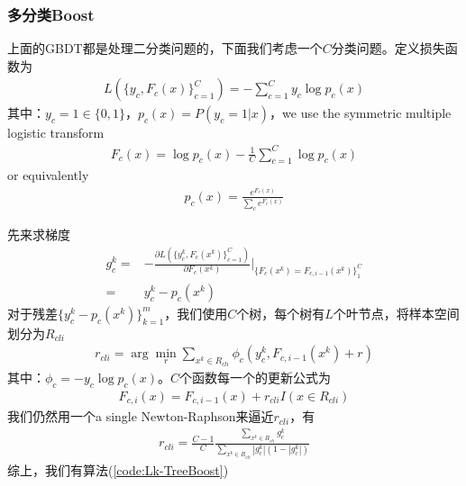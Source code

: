           \subsubsection{多分类Boost}
              \par
              上面的GBDT都是处理二分类问题的，下面我们考虑一个$C$分类问题。定义损失函数为
              \begin{align*}
              L(\{y_c,F_c(x)\}_{c=1}^C) = -\sum_{c=1}^C y_c \log p_c(x)
              \end{align*}
              其中：$y_c = 1\in \{0,1\}$，$p_c(x) =  P(y_c = 1|x)$，we use the symmetric multiple logistic transform
              \begin{align*}
              F_c(x) = \log p_c(x) - \frac{1}{C}\sum_{c=1}^C\log p_c(x)
              \end{align*}
              or equivalently
              \begin{align*}
              p_c(x) = \frac{e^{F_c(x)}}{\sum_c e^{F_c(x)}}
              \end{align*}
              \par
              先来求梯度
              \begin{align*}
              g_c^k =&  -\frac{\partial L(\{y_c^k,F_c(x^k)\}_{c=1}^C)}{\partial F_c(x^k)} \bigg|_{\{F_c(x^k) = F_{c,i-1}(x^k)\}_1^C}\\
              =& y_c^k - p_c(x^k)
              \end{align*}
              对于残差$\{y_c^k - p_c(x^k)\}_{k=1}^m$，我们使用$C$个树，每个树有$L$个叶节点，将样本空间划分为$R_{cli}$
              \begin{align*}
              r_{cli} = \arg\min_r \sum_{x^k\in R_{cli}} \phi_c(y_c^k,F_{c,i-1}(x^k)+r)
              \end{align*}
              其中：$\phi_c = -y_c\log p_c(x)$。$C$个函数每一个的更新公式为
              \begin{align*}
              F_{c,i}(x) = F_{c,i-1}(x) + r_{cli}I(x\in R_{cli})
              \end{align*}
              我们仍然用一个a single Newton-Raphson来逼近$r_{cli}$，有
              \begin{align*}
              r_{cli} = \frac{C-1}{C} \frac{\sum_{x^k\in R_{cli}}g_c^k}{\sum_{x^k\in R_{cli}}|g_{c}^k|(1-|g_c^k|)}
              \end{align*}
              综上，我们有算法(\ref{code:Lk-TreeBoost})
